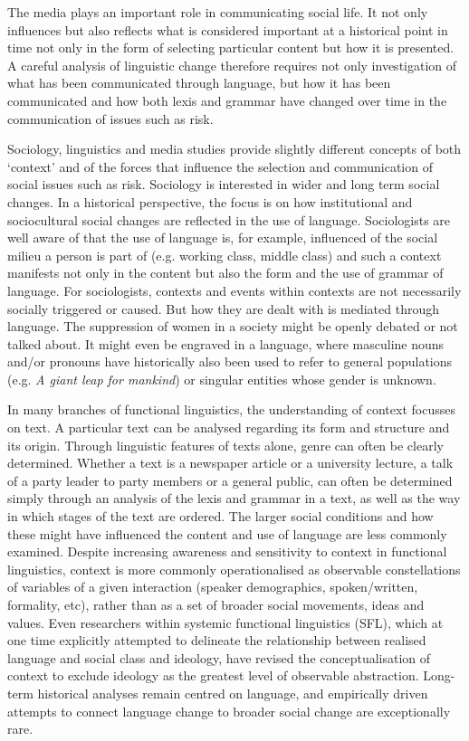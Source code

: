 The media plays an important role in communicating social life. It not only influences but also reflects what is considered important at a historical point in time not only in the form of selecting particular content but how it is presented. A careful analysis of linguistic change therefore requires not only investigation of what has been communicated through language, but how it has been communicated and how both lexis and grammar have changed over time in the communication of issues such as risk.

Sociology, linguistics and media studies provide slightly different concepts of both `context' and of the forces that influence the selection and communication of social issues such as risk. Sociology is interested in wider and long term social changes. In a historical perspective, the focus is on how institutional and sociocultural social changes are reflected in the use of language. Sociologists are well aware of that the use of language is, for example, influenced of the social milieu a person is part of (e.g. working class, middle class) and such a context manifests not only in the content but also the form and the use of grammar of language. For sociologists, contexts and events within contexts are not necessarily socially triggered or caused. But how they are dealt with is mediated through language. The suppression of women in a society might be openly debated or not talked about. It might even be engraved in a language, where masculine nouns and\slash or pronouns have historically also been used to refer to general populations (e.g. \emph{A giant leap for mankind}) or singular entities whose gender is unknown.


In many branches of functional linguistics, the understanding of context focusses on text. A particular text can be analysed regarding its form and structure and its origin. Through linguistic features of texts alone, genre can often be clearly determined. Whether a text is a newspaper article or a university lecture, a talk of a party leader to party members or a general public, can often be determined simply through an analysis of the lexis and grammar in a text, as well as the way in which stages of the text are ordered. The larger social conditions and how these might have influenced the content and use of language are less commonly examined. Despite increasing awareness and sensitivity to context in functional linguistics, context is more commonly operationalised as observable constellations of variables of a given interaction (speaker demographics, spoken\slash written, formality, etc), rather than as a set of broader social movements, ideas and values. Even researchers within systemic functional linguistics (SFL), which at one time explicitly attempted to delineate the relationship between realised language and social class and ideology, have revised the conceptualisation of context to exclude ideology as the greatest level of observable abstraction. Long-term historical analyses remain centred on language, and empirically driven attempts to connect language change to broader social change are exceptionally rare.


